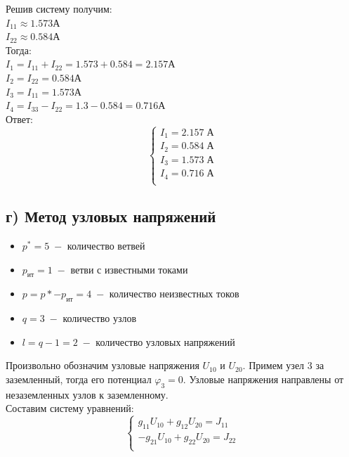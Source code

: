 \documentclass[12pt,fleqn]{article}
\begin{document}
\begin{justify}
    Решив систему получим: \\
    $ I_{11} \approx 1.573 \text{А} $ \\
    $ I_{22} \approx 0.584 \text{А} $ \\

    Тогда: \\
    $ I_1 = I_{11} + I_{22} = 1.573 + 0.584 = 2.157 \text{А} $ \\
    $ I_2 = I_{22} = 0.584 \text{А} $ \\
    $ I_3 = I_{11} = 1.573 \text{А} $ \\
    $ I_4 = I_{33} - I_{22} = 1.3 - 0.584 = 0.716 \text{А} $ \\

    Ответ: \\
    \begin{equation}
        \begin{cases}
            I_1 = 2.157 \; \text{А} \\
            I_2 = 0.584 \; \text{А} \\
            I_3 = 1.573 \; \text{А} \\
            I_4 = 0.716 \; \text{А} \\
        \end{cases}
    \end{equation}

\newpage

\subsection{г) Метод узловых напряжений}
    \begin{itemize}
        \item $p^* = 5 \;- $ количество ветвей
        \item $ p_\text{ит} = 1 \; - $ ветви с известными токами
        \item $ p = p* - p_\text{ит} = 4 \; - $ количество неизвестных токов
        \item $ q = 3 \; - $ количество узлов
        \item $ l = q - 1 = 2 \; -$ количество узловых напряжений 
    \end{itemize}

    Произвольно обозначим узловые напряжения $U_{10}$ и $U_{20}$.
    Примем узел 3 за заземленный, тогда его потенциал $\varphi_3 = 0$.
    Узловые напряжения направлены от незаземленных узлов к заземленному.\\
    Составим систему уравнений: \\
    \begin{equation}
        \begin{cases}
            g_{11}U_{10} + g_{12}U_{20} = J_{11} \\
            -g_{21}U_{10} + g_{22}U_{20} = J_{22} \\
        \end{cases}
    \end{equation}


\end{justify}
\end{document}
